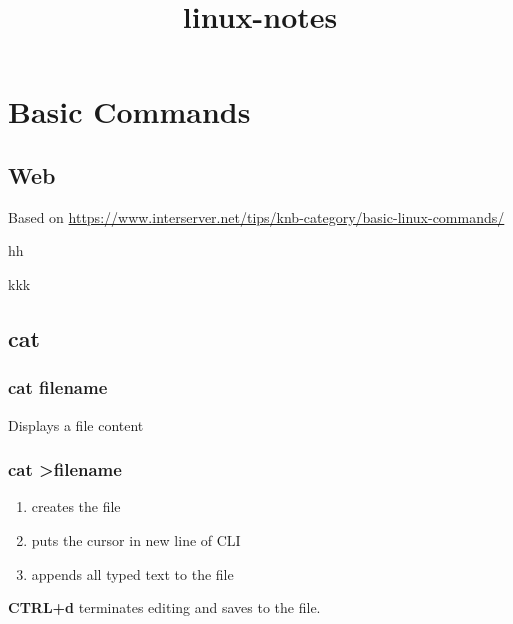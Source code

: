 \documentclass{report}
\title{linux-notes}
\begin{document}
	
	

\part{Basic Commands}



\chapter{Web}
Based on \url{https://www.interserver.net/tips/knb-category/basic-linux-commands/}

hh

kkk

\chapter{cat}


\section{cat filename}
Displays a file content


\section{cat \textgreater filename}
\begin{enumerate}
	\item creates the file
	\item puts the cursor in new line of CLI
	\item appends all typed text to the file
\end{enumerate}
\textbf{CTRL+d} terminates editing and saves to the file.
	
	
	
\end{document}
